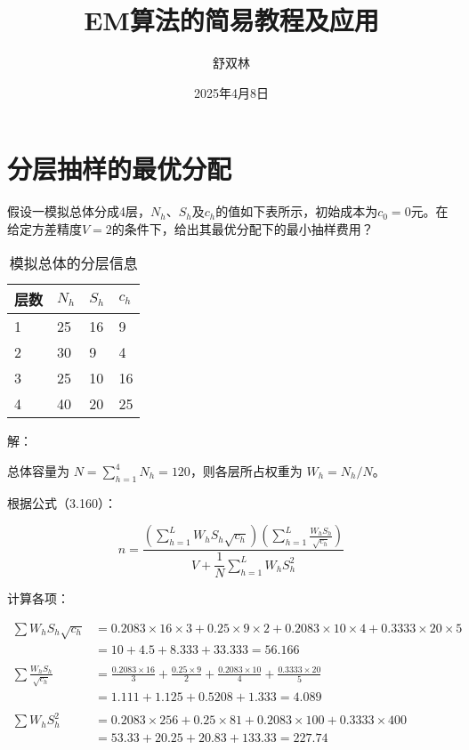 \documentclass[cn,hazy,blue,12pt,normal]{elegantnote}
\author{\kaishu 舒双林}
\title{\kaishu EM算法的简易教程及应用}
\date{2025年4月8日}
\begin{document}
\maketitle
\section{分层抽样的最优分配}
\begin{example}
    假设一模拟总体分成4层，$N_h$、$S_h$及$c_h$的值如下表所示，初始成本为$c_0 = 0$元。在给定方差精度$V=2$的条件下，给出其最优分配下的最小抽样费用？
\begin{table}[htpb]
    \centering
    \caption{模拟总体的分层信息}
    \begin{tabular}{p{2cm}p{2cm}p{2cm}p{2cm}}
        \toprule
        层数 & $N_h$ & $S_h$ & $c_h$ \\
        \midrule
        1 & 25 & 16 & 9 \\
        2 & 30 & 9 & 4 \\
        3 & 25 & 10 & 16 \\
        4 & 40 & 20 & 25 \\
        \bottomrule
    \end{tabular}
    \label{tab:example3-5}
\end{table}
\end{example}
解：

总体容量为 $N = \sum_{h=1}^4 N_h = 120$，则各层所占权重为 $W_h = N_h / N$。


根据公式（3.160）：

\[
n = \frac{
\left( \sum_{h=1}^L W_h S_h \sqrt{c_h} \right) \left( \sum_{h=1}^L \frac{W_h S_h}{\sqrt{c_h}} \right)
}{
V + \dfrac{1}{N} \sum_{h=1}^L W_h S_h^2
}
\]

计算各项：


\begin{align*}
    \sum W_h S_h \sqrt{c_h} &= 0.2083 \times 16 \times 3 + 0.25 \times 9 \times 2 + 0.2083 \times 10 \times 4 + 0.3333 \times 20 \times 5 \\
&= 10 + 4.5 + 8.333 + 33.333 = 56.166 \\
\\
\sum \frac{W_h S_h}{\sqrt{c_h}} &= \frac{0.2083 \times 16}{3} + \frac{0.25 \times 9}{2} + \frac{0.2083 \times 10}{4} + \frac{0.3333 \times 20}{5} \\
&= 1.111 + 1.125 + 0.5208 + 1.333 = 4.089 \\
\\
\sum W_h S_h^2 &= 0.2083 \times 256 + 0.25 \times 81 + 0.2083 \times 100 + 0.3333 \times 400 \\
&= 53.33 + 20.25 + 20.83 + 133.33 = 227.74
\end{align*}
\end{document}
